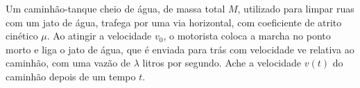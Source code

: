 \documentclass[]{IMTexam}
\begin{document}
\begin{questions}
	\medskip

	\question Um caminhão-tanque cheio de água, de massa total $ M $, utilizado para limpar ruas com um jato de água, trafega por uma via horizontal, com coeficiente de atrito cinético $\mu$. Ao atingir a velocidade $ v_0 $, o motorista coloca a marcha no ponto morto e liga o jato de água, que é enviada para trás com velocidade ve relativa ao caminhão, com uma vazão de $ \lambda $ litros por segundo. Ache a velocidade $ v(t) $ do caminhão depois de um tempo $ t $.

	\begin{solution}

	\end{solution}

\end{questions}
\end{document}
